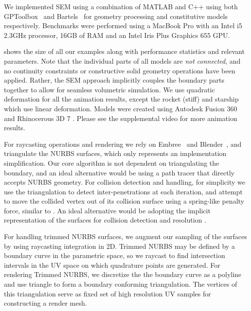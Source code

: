 We implemented SEM using a combination of MATLAB and C++ using both GPToolbox~\cite{gptoolbox} and Bartels~\cite{bartels} for geometry processing and constitutive models 
respectively. Benchmarks were performed using a MacBook Pro with an Intel i5 2.3GHz processor, 16GB of RAM and an Intel Iris Plus Graphics 655 GPU.

 shows the size of all our examples along with performance statistics and relevant parameters. 
Note that the individual parts of all models are \emph{not connected}, and no continuity constraints or constructive solid geometry operations have been applied. 
Rather, the SEM approach implicitly couples the boundary parts together to allow for seamless volumetric simulation. 
We use quadratic deformation for all the animation results, except the rocket (stiff) and starship which use linear deformation.
Models were created using Autodesk Fusion 360 \cite{AutodeskFusion360} and Rhinocerous 3D 7 \cite{mcneel-rhinoceros}. 
Please see the supplemental video for more animation results.
  
For raycasting operations and rendering we rely on Embree~\cite{10.1145/2601097.2601199} and Blender~\cite{blender}, and triangulate the NURBS surfaces, which only represents an implementation simplification. 
Our core algorithm is not dependent on triangulating the boundary, and an ideal alternative would be using a path tracer that directly accepts NURBS geometry.
For collision detection and handling, for simplicity we use the triangulation to detect inter-penetrations at each iteration, and attempt to move the collided vertex out of its collision surface using a spring-like penalty force, similar to \cite{10.1145/3355089.3356486, 10.1145/2010324.1964932}.
An ideal alternative would be adopting the implicit representation of the surfaces for collision detection and resolution \cite{10.1145/1516522.1516523, 10.1145/3306346.3323010}. 

For handling trimmed NURBS surfaces, we augment our sampling of the surfaces by using raycasting integration in 2D. Trimmed NURBS may be defined by a boundary curve in the parametric space, so we raycast to find intersection intervals in the UV space on which quadrature points are generated. For rendering Trimmed NURBS, we discretize the the boundary curve as a polyline and use triangle \cite{shewchuk96b, SHEWCHUK200221} to form a boundary conforming triangulation. The vertices of this triangulation serve as fixed set of high resolution UV samples for constructing a render mesh.

